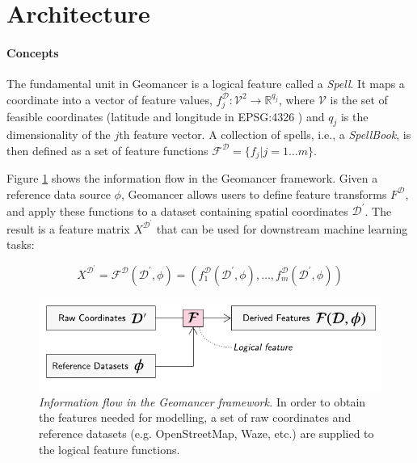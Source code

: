 \documentclass{article}
\begin{document}
\section{Architecture}

\paragraph{Concepts}

The fundamental unit in Geomancer is a logical feature \cite{smith2017ballet}
called a \textit{Spell}. It maps a coordinate into a vector of feature values,
$f_{j}^{\mathcal{D}} : \mathcal{V}^{2} \rightarrow \mathbb{R}^{q_j}$, where
$\mathcal{V}$ is the set of feasible coordinates (latitude and longitude in
EPSG:4326 \cite{WGS84EPS46:online}) and $q_{j}$ is the dimensionality of the
$j$th feature vector. A collection of spells, i.e., a \textit{SpellBook}, is
then defined as a set of feature functions $\mathcal{F}^{\mathcal{D}} = \{f_j
\vert j = 1 \dots m\}$. 

Figure \ref{fig:info_flow} shows the information flow in the Geomancer
framework. Given a reference data source $\phi$, Geomancer allows users to
define feature transforms $F^{\mathcal{D}}$, and apply these functions to a
dataset containing spatial coordinates $\mathcal{D}^{\prime}$. The result is a
feature matrix $X^{\mathcal{D}^\prime}$ \cite{smith2017ballet} that can be used
for downstream machine learning tasks: 

\begin{equation}
    X^{\mathcal{D}^\prime} = 
    \mathcal{F}^{\mathcal{D}}(\mathcal{D}^\prime, \phi) = 
    (f_{1}^{\mathcal{D}}(\mathcal{D}^\prime, \phi), \dots,
    f_{m}^{\mathcal{D}}(\mathcal{D}^\prime, \phi))
\end{equation}

\begin{figure}[t]
    \begin{center}
        \includegraphics[width=0.85\linewidth]{info_flow.pdf}
    \end{center}
    \caption{
        \textit{Information flow in the Geomancer framework.}  In order to obtain
        the features needed for modelling, a set of raw coordinates and
        reference datasets (e.g. OpenStreetMap, Waze, etc.) are supplied to the
        logical feature functions.
    }
  \label{fig:info_flow}
\end{figure}
\end{document}
